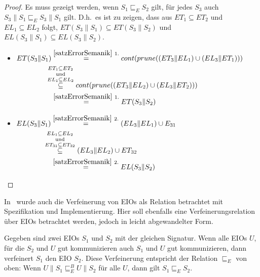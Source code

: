 \begin{proof}
  Es muss gezeigt werden, wenn $S_1\sqsubseteq _E S_2$ gilt, für jedes
  $S_3$ auch
  $S_3\|S_1\sqsubseteq _E S_3\|S_1$ gilt. D.h.\ es ist zu zeigen, dass aus
  $ET_1\subseteq ET_2$ und $EL_1\subseteq EL_2$ folgt, $ET(S_3\|S_1)\subseteq
  ET(S_3\|S_2)$ und $EL(S_3\|S_1)\subseteq EL(S_3\|S_2)$.\\
  \begin{itemize}
    \item $\begin{aligned}[t]
        ET(S_3\|S_1) &\overset{\ref{satzErrorSemanik}~1.}{=}
      cont(prune((ET_3\|EL_1)\cup (EL_3\|ET_1)))\\
      &\hspace{-0.3cm}\overset{ET_1\subseteq
    ET_2}{\overset{\mathrm{und}}{\overset{EL_1\subseteq EL_2}{\subseteq}}}
    cont(prune((ET_3\|EL_2)\cup (EL_3\|ET_2)))\\
      &\overset{\ref{satzErrorSemanik}~1.}{=} ET(S_3\|S_2)
    \end{aligned}$
    \item $\begin{aligned}[t]
        EL(S_3\|S_1) &\overset{\ref{satzErrorSemanik}~2.}{=} (EL_3\|EL_1)\cup
        E_{31}\\
        &\hspace{-0.4cm}\overset{EL_1\subseteq
      EL_2}{\overset{\mathrm{und}}{\overset{ET_{31}\subseteq
      ET_{32}}{\subseteq}}} (EL_3\|EL_2)\cup ET_{32}\\
      &\overset{\ref{satzErrorSemanik}~2.}{=} EL(S_3\|S_2)
    \end{aligned}$
  \end{itemize}
\end{proof}

In~\cite{Vogler2014EIO} wurde auch die Verfeinerung von EIOs als Relation betrachtet
mit Spezifikation und Implementierung. Hier soll ebenfalls eine
Verfeinerungsrelation über EIOs betrachtet werden, jedoch in leicht
abgewandelter Form.

\begin{lem}
  \label{lemVerfeinerung}
  Gegeben sind zwei EIOs $S_1$ und $S_2$ mit der gleichen Signatur. Wenn alle
  EIOs $U$, für die $S_2$ und $U$ gut kommunizieren auch $S_1$
  und $U$ gut kommunizieren, dann verfeinert $S_1$ den EIO $S_2$. Diese Verfeinerung
  entspricht der Relation $\sqsubseteq _E$ von oben: Wenn $U\|S_1 \sqsubseteq
  _E^B U\|S_2$ für alle $U$, dann gilt $S_1\sqsubseteq _E S_2$.
\end{lem}


